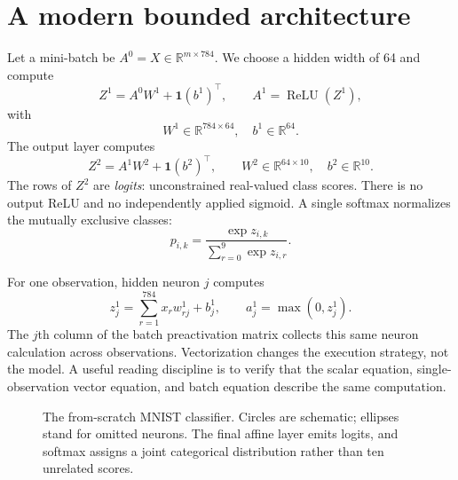 \section{A modern bounded architecture}

Let a mini-batch be $A^0=X\in\mathbb R^{m\times784}$. We choose a hidden width
of 64 and compute
\[
  Z^1=A^0W^1+\mathbf1(b^1)^\top,
  \qquad
  A^1=\operatorname{ReLU}(Z^1),
\]
with
\[
  W^1\in\mathbb R^{784\times64},
  \quad b^1\in\mathbb R^{64}.
\]
The output layer computes
\[
  Z^2=A^1W^2+\mathbf1(b^2)^\top,
  \qquad
  W^2\in\mathbb R^{64\times10},
  \quad b^2\in\mathbb R^{10}.
\]
The rows of $Z^2$ are \emph{logits}: unconstrained real-valued class scores.
There is no output ReLU and no independently applied sigmoid. A single softmax
normalizes the mutually exclusive classes:
\[
  p_{i,k}=\frac{\exp z_{i,k}}{\sum_{r=0}^{9}\exp z_{i,r}}.
\]

For one observation, hidden neuron $j$ computes
\[
  z_j^1=\sum_{r=1}^{784}x_rw_{rj}^1+b_j^1,
  \qquad a_j^1=\max(0,z_j^1).
\]
The $j$th column of the batch preactivation matrix collects this same neuron
calculation across observations. Vectorization changes the execution strategy,
not the model. A useful reading discipline is to verify that the scalar
equation, single-observation vector equation, and batch equation describe the
same computation.

\begin{figure}[htbp]
\centering
{}
\caption{The from-scratch MNIST classifier. Circles are schematic; ellipses
stand for omitted neurons. The final affine layer emits logits, and softmax
assigns a joint categorical distribution rather than ten unrelated scores.}
\label{fig:mnist-mlp-architecture}
\end{figure}

